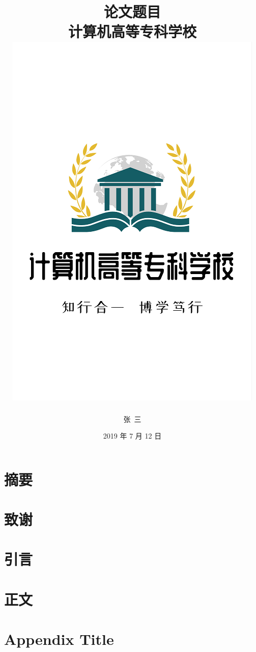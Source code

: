 \documentclass[12pt]{ctexrep}
\title{
{论文题目}\\
{\large 计算机高等专科学校}\\
{\includegraphics{logo.png}}
}
\author{张\ 三}
\date{2019 年 7 月 12 日}
\begin{document}
\maketitle

\chapter*{摘要}
\zhlipsum[1]
 
\chapter*{致谢}
\zhlipsum[1]
 
\tableofcontents

\chapter{引言}
\zhlipsum

\chapter{正文}
\zhlipsum

\appendix
\chapter{Appendix Title}
\zhlipsum[1]
\end{document}
